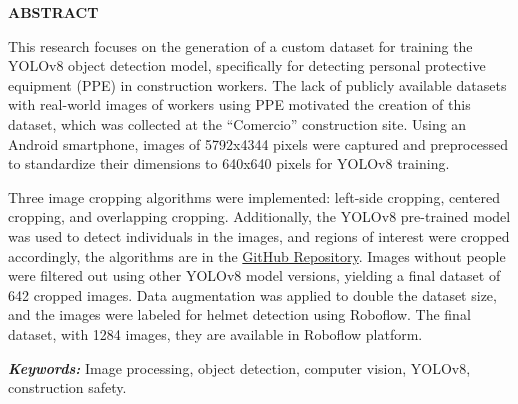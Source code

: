 \thispagestyle{plain}

\newpage

\begin{center}
  \textbf{ABSTRACT}
\end{center}

\vspace{1cm}

This research focuses on the generation of a custom dataset for training the YOLOv8 object detection model, specifically for detecting personal protective equipment (PPE) in construction workers. The lack of publicly available datasets with real-world images of workers using PPE motivated the creation of this dataset, which was collected at the ``Comercio'' construction site. Using an Android smartphone, images of 5792x4344 pixels were captured and preprocessed to standardize their dimensions to 640x640 pixels for YOLOv8 training.

Three image cropping algorithms were implemented: left-side cropping, centered cropping, and overlapping cropping. Additionally, the YOLOv8 pre-trained model was used to detect individuals in the images, and regions of interest were cropped accordingly, the algorithms are in the \href{https://github.com/Aleticod/yolo_image_preprocessing}{GitHub Repository}. Images without people were filtered out using other YOLOv8 model versions, yielding a final dataset of 642 cropped images. Data augmentation was applied to double the dataset size, and the images were labeled for helmet detection using Roboflow. The final dataset, with 1284 images, they are available in Roboflow platform.

\textit{\textbf{Keywords:}} Image processing, object detection, computer vision, YOLOv8, construction safety.

\vfill

\pagebreak